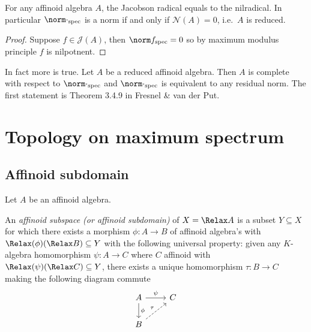\documentclass[a4paper]{article}
\let\Sp\Relax
\DeclareMathOperator{\Sp}{Sp} %
\begin{document}
\begin{corollary}
  For any affinoid algebra \(A\), the Jacobson radical equals to the nilradical. In particular \(\norm \cdot_{\mathrm{spec}}\) is a norm if and only if \(\mathcal N(A) = 0\), i.e.\ \(A\) is reduced.
\end{corollary}

\begin{proof}
  Suppose \(f \in \mathcal J(A)\), then \(\norm f_{\mathrm{spec}} = 0\) so by maximum modulus principle \(f\) is nilpotnent.
\end{proof}

\begin{remark}
  In fact more is true. Let \(A\) be a reduced affinoid algebra. Then \(A\) is complete with respect to \(\norm \cdot_{\mathrm{spec}}\) and \(\norm \cdot_{\mathrm{spec}}\) is equivalent to any residual norm. The first statement is Theorem 3.4.9 in Fresnel \& van der Put.
\end{remark}

\section{Topology on maximum spectrum}

\subsection{Affinoid subdomain}

Let \(A\) be an affinoid algebra.

\begin{definition}
  An \emph{affinoid subspace (or affinoid subdomain)} of \(X = \Sp A\) is a subset \(Y \subseteq X\) for which there exists a morphism \(\phi: A \to B\) of affinoid algebra's with \(\Sp(\phi) (\Sp B) \subseteq Y\) with the following universal property: given any \(K\)-algebra homomorphism \(\psi: A \to C\) where \(C\) affinoid with \(\Sp(\psi)(\Sp C) \subseteq Y\), there exists a unique homomorphism \(\tau: B \to C\) making the following diagram commute
  \[
    \begin{tikzcd}
      A \ar[r, "\psi"] \ar[d, "\phi"] & C \\
      B \ar[ur, dashed, "\tau"]
    \end{tikzcd}
  \]
\end{definition}
\end{document}

